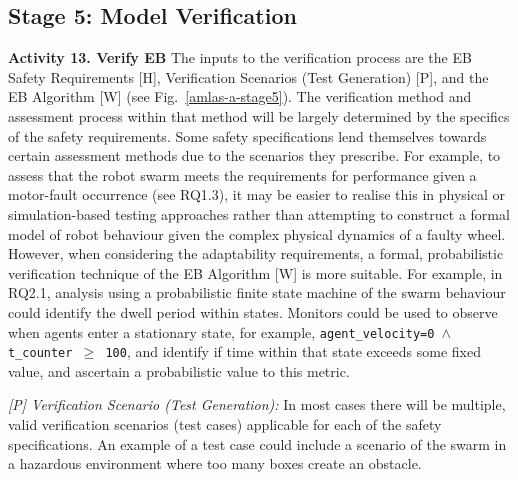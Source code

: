 \documentclass[runningheads]{llncs}
\begin{document}
\subsection{Stage 5: Model Verification} \label{framework-stage5}
\vspace{-0.6ex}
\noindent\textbf{Activity 13. Verify EB} The inputs to the verification process are the EB Safety Requirements [H], Verification Scenarios (Test Generation) [P], and the EB Algorithm [W] (see Fig.~\ref{amlas-a-stage5}). 
%
The verification method and assessment process within that method will be largely determined by the specifics of the safety requirements. Some safety specifications lend themselves towards certain assessment methods due to the scenarios they prescribe.
%
For example, to assess that the robot swarm meets the requirements for performance given a motor-fault occurrence (see RQ1.3), it may be easier to realise this in physical or simulation-based testing approaches rather than attempting to construct a formal model of robot behaviour given the complex physical dynamics of a faulty wheel. 
%
However, when considering the adaptability requirements, a formal, probabilistic verification technique of the EB Algorithm [W] is more suitable. For example, in RQ2.1, analysis using a probabilistic finite state machine of the swarm behaviour could identify the dwell period within states. Monitors could be used to observe when agents enter a stationary state, for example, \texttt{agent\_velocity=0 $\land $  t\_counter  $\ge$ 100}, and identify if time within that state exceeds some fixed value, and ascertain a probabilistic value to this metric.

\emph{[P] Verification Scenario (Test Generation):} In most cases there will be multiple, valid verification scenarios (test cases) applicable for each of the safety specifications. 
An example of a test case could include a scenario of the swarm in a hazardous environment where too many boxes create an obstacle.%
%
%
%
%
%
\end{document}
